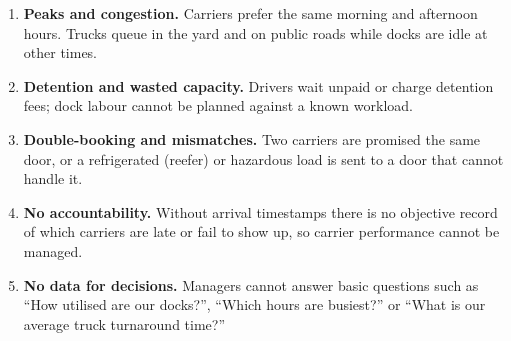 \begin{enumerate}
  \item \textbf{Peaks and congestion.} Carriers prefer the same morning and afternoon hours. Trucks queue in the yard and on public roads while docks are idle at other times.
  \item \textbf{Detention and wasted capacity.} Drivers wait unpaid or charge detention fees; dock labour cannot be planned against a known workload.
  \item \textbf{Double-booking and mismatches.} Two carriers are promised the same door, or a refrigerated (reefer) or hazardous load is sent to a door that cannot handle it.
  \item \textbf{No accountability.} Without arrival timestamps there is no objective record of which carriers are late or fail to show up, so carrier performance cannot be managed.
  \item \textbf{No data for decisions.} Managers cannot answer basic questions such as ``How utilised are our docks?'', ``Which hours are busiest?'' or ``What is our average truck turnaround time?''
\end{enumerate}


